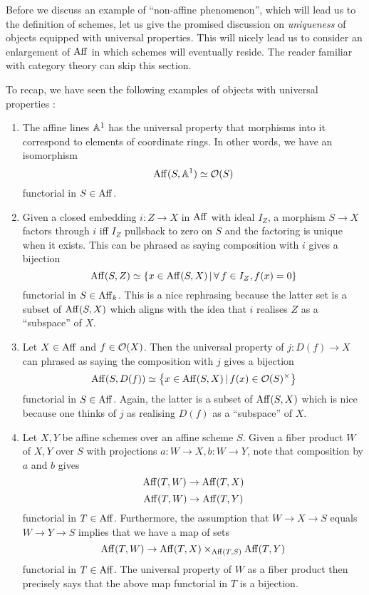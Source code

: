 \documentclass[./main.tex]{subfiles}
\begin{document}
Before we discuss an example of ``non-affine phenomenon'',
which will lead us to the definition of schemes,
let us give the promised discussion on
\emph{uniqueness} of objects equipped with universal properties.
This will nicely lead us to consider
an enlargement of $\mathrm{Aff}$ in which schemes will eventually reside.
The reader familiar with category theory can skip this section.

To recap, we have seen the following examples of
objects with universal properties :
\begin{enumerate}
  \item The affine lines $\mathbb{A}^1$ has the universal property that
  morphisms into it correspond to elements of coordinate rings.
  In other words,
  we have an isomorphism \[
    \mathrm{Aff}(S , \mathbb{A}^1)  \simeq \mathcal{O}(S)
  \]
  functorial in $S \in \mathrm{Aff}$.
  \item Given a closed embedding $i : Z \to X$ in $\mathrm{Aff}$
  with ideal $I_Z$,
  a morphism $S \to X$ factors through $i$ iff
  $I_Z$ pullsback to zero on $S$ and the
  factoring is unique when it exists.
  This can be phrased as saying
  composition with $i$ gives a bijection
  \[
    \mathrm{Aff} (S , Z) \simeq \left\{
      x \in \mathrm{Aff}(S , X) \,|\, \forall\,f \in I_Z , f(x) = 0
    \right\} 
  \]
  functorial in $S \in \mathrm{Aff}_k$.
  This is a nice rephrasing because the latter set
  is a subset of $\mathrm{Aff}(S , X)$
  which aligns with the idea that $i$ realises
  $Z$ as a ``subspace'' of $X$.
  \item Let $X \in \mathrm{Aff}$ and $f \in \mathcal{O}(X)$.
  Then the universal property of $j : D(f) \to X$ can 
  phrased as saying the composition with $j$ gives a bijection
  \[
    \mathrm{Aff}(S , D(f)) \simeq \left\{
      x \in \mathrm{Aff}(S , X) \,|\, f(x) \in \mathcal{O}(S)^\times
    \right\}
  \]
  functorial in $S \in \mathrm{Aff}$.
  Again, the latter is a subset of $\mathrm{Aff}(S , X)$ which is nice
  because one thinks of $j$ as realising $D(f)$ as a ``subspace'' of $X$.
  \item Let $X , Y$ be affine schemes over an affine scheme $S$.
  Given a fiber product $W$ of $X , Y$ over $S$
  with projections $a : W \to X , b : W \to Y$,
  note that composition by $a$ and $b$ gives 
  \[
    \mathrm{Aff}(T , W) \to \mathrm{Aff}(T , X)  
  \]
  \[
    \mathrm{Aff}(T , W) \to \mathrm{Aff}(T , Y)  
  \]
  functorial in $T \in \mathrm{Aff}$.
  Furthermore, the assumption that $W \to X \to S$ equals
  $W \to Y \to S$ implies that
  we have a map of sets \[
    \mathrm{Aff}(T , W) \to \mathrm{Aff}(T , X) \times_{\mathrm{Aff}(T , S)} \mathrm{Aff}(T , Y)
  \]
  functorial in $T \in \mathrm{Aff}$.
  The universal property of $W$ as a fiber product
  then precisely says that the above map
  functorial in $T$ is a bijection.
\end{enumerate}
\end{document}
